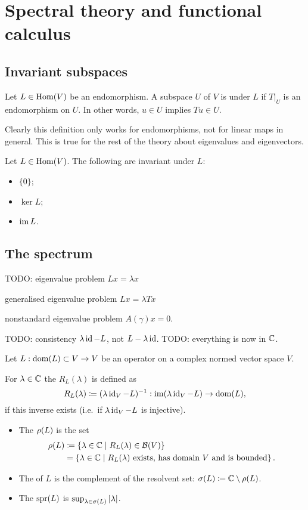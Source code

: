 \chapter{Spectral theory and functional calculus}
\section{Invariant subspaces}
\begin{definition}
Let $L\in \operatorname{Hom}(V)$ be an endomorphism. A subspace $U$ of $V$ is  under $L$ if $T|_U$ is an endomorphism on $U$. In other words, $u\in U$ implies $Tu\in U$.
\end{definition}
Clearly this definition only works for endomorphisms, not for linear maps in general. This is true for the rest of the theory about eigenvalues and eigenvectors.
\begin{example}
Let $L\in \operatorname{Hom}(V)$. The following are invariant under $L$:
\begin{itemize}
\item $\{0\}$;
\item $\ker L$;
\item $\operatorname{im} L$.
\end{itemize}
\end{example}

\section{The spectrum}
TODO: eigenvalue problem $Lx = \lambda x$

generalised eigenvalue problem $Lx = \lambda T x$

nonstandard eigenvalue problem $A(\gamma)x = 0$.

TODO: consistency $\lambda \operatorname{id} - L$, not $L-\lambda \operatorname{id}$.
TODO: everything is now in $\mathbb{C}$.

\begin{definition}
Let $L: \operatorname{dom}(L)\subset V \to V$ be an operator on a complex normed vector space $V$.

For $\lambda\in\mathbb{C}$ the  $R_L(\lambda)$ is defined as
\[ R_L(\lambda) \coloneqq (\lambda \operatorname{id}_V - L)^{-1}: \operatorname{im}(\lambda \operatorname{id}_V - L)\to\operatorname{dom}(L), \]
if this inverse exists (i.e.\ if $\lambda \operatorname{id}_V - L$ is injective).
\begin{itemize}
\item The  $\rho(L)$ is the set
\begin{align*}
\rho(L) &\coloneqq \left\{ \lambda\in \mathbb{C} \;\middle|\; R_L(\lambda)\in\operatorname{\mathcal{B}}(V) \right\} \\
&= \left\{ \lambda\in \mathbb{C} \;\middle|\; \text{$R_L(\lambda)$ exists, has domain $V$ and is bounded} \right\}.
\end{align*}
\item The  of $L$ is the complement of the resolvent set: $\sigma(L) \coloneqq \mathbb{C}\setminus\rho(L)$.
\item The  $\operatorname{spr}(L)$ is $\sup_{\lambda\in\sigma(L)} |\lambda|$.
\end{itemize}
\end{definition}


